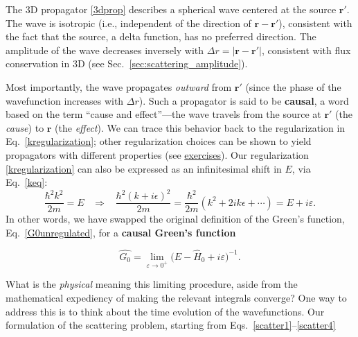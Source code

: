 \documentclass[pra,12pt]{revtex4-2}
\begin{document}
The 3D propagator \eqref{3dprop} describes a spherical wave centered
at the source $\mathbf{r}'$.  The wave is isotropic (i.e., independent
of the direction of $\mathbf{r} - \mathbf{r}'$), consistent with the
fact that the source, a delta function, has no preferred direction.
The amplitude of the wave decreases inversely with $\Delta r =
|\mathbf{r}-\mathbf{r}'|$, consistent with flux conservation in 3D
(see Sec.~\ref{sec:scattering_amplitude}).

Most importantly, the wave propagates \textit{outward} from
$\mathbf{r}'$ (since the phase of the wavefunction increases with
$\Delta r$).  Such a propagator is said to be \textbf{causal}, a word
based on the term ``cause and effect''---the wave travels from the
source at $\mathbf{r}'$ (the \textit{cause}) to $\mathbf{r}$ (the
\textit{effect}).  We can trace this behavior back to the
regularization in Eq.~\eqref{kregularization}; other regularization
choices can be shown to yield propagators with different properties
(see \hyperref[ex:anticausal]{exercises}).  Our regularization
\eqref{kregularization} can also be expressed as an infinitesimal
shift in $E$, via Eq.~\eqref{keq}:
\begin{equation}
  \frac{\hbar^2 k^2}{2m} = E
  \;\;\;\Rightarrow\;\;\;
  \frac{\hbar^2 (k+i\epsilon)^2}{2m}
  = \frac{\hbar^2}{2m} \left(k^2 + 2ik\epsilon + \cdots\right)
  = E + i\varepsilon.
\end{equation}
In other words, we have swapped the original definition of the Green's
function, Eq.~\eqref{G0unregulated}, for a \textbf{causal Green's
  function}
\begin{framed}
  \begin{equation}
    \hat{G_0} = \lim_{\varepsilon\rightarrow 0^+} \big(E - \hat{H}_0 + i \varepsilon\big)^{-1}.
    \label{G0regulated}
  \end{equation}
\end{framed}

What is the \textit{physical} meaning this limiting procedure, aside
from the mathematical expediency of making the relevant integrals
converge?  One way to address this is to think about the time
evolution of the wavefunctions.  Our formulation of the scattering
problem, starting from Eqs.~\eqref{scatter1}--\eqref{scatter4}




\end{document}
